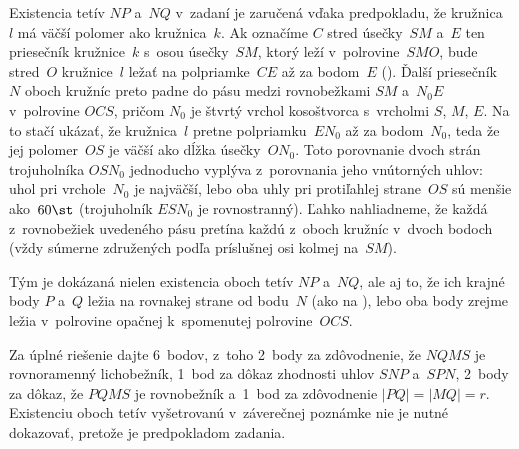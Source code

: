 {\poznamka
Existencia tetív $NP$ a~$NQ$ v~zadaní je zaručená
vďaka predpokladu, že kružnica~$l$ má väčší polomer ako
kružnica~$k$.
Ak označíme $C$ stred úsečky~$SM$ a~$E$ ten priesečník kružnice~$k$ s~osou úsečky~$SM$,
ktorý leží v~polrovine~$SMO$, bude stred~$O$ kružnice~$l$ ležať na polpriamke~$CE$
až za bodom~$E$ (\obr).
%
Ďalší priesečník~$N$ oboch kružníc preto padne do pásu medzi rovnobežkami $SM$ a~$N_0E$
v~polrovine $OCS$, pričom $N_0$ je štvrtý vrchol kosoštvorca s~vrcholmi $S$, $M$, $E$.
Na to stačí ukázať, že kružnica~$l$ pretne polpriamku~$EN_0$ až za bodom~$N_0$,
teda že jej polomer~$OS$ je väčší ako dĺžka úsečky~$ON_0$. Toto
porovnanie dvoch strán trojuholníka $OSN_0$ jednoducho vyplýva z~porovnania jeho
vnútorných uhlov: uhol pri vrchole~$N_0$ je najväčší, lebo oba uhly pri
protiľahlej strane~$OS$ sú menšie ako~$60\st$ (trojuholník $ESN_0$ je rovnostranný).
Ľahko nahliadneme, že každá z~rovnobežiek uvedeného pásu pretína každú z~oboch
kružníc v~dvoch bodoch (vždy súmerne združených podľa príslušnej osi kolmej na~$SM$).

Tým je dokázaná nielen existencia oboch tetív $NP$ a~$NQ$, ale aj to, že
ich krajné body $P$ a~$Q$ ležia na rovnakej strane od bodu~$N$ (ako na ),
lebo oba body zrejme ležia v~polrovine opačnej k~spomenutej polrovine~$OCS$.


\nobreak\medskip\petit\noindent
Za úplné riešenie dajte 6~bodov, z~toho 2~body za zdôvodnenie, že $NQMS$ je
rovnoramenný lichobežník, 1~bod za
dôkaz zhodnosti uhlov $SNP$ a~$SPN$, 2~body za dôkaz, že $PQMS$ je rovnobežník
a~1~bod za zdôvodnenie $|PQ| = |MQ| = r$.
Existenciu oboch tetív vyšetrovanú
v~záverečnej poznámke nie je nutné dokazovať, pretože je predpokladom zadania.
\endpetit
\bigbreak
}

